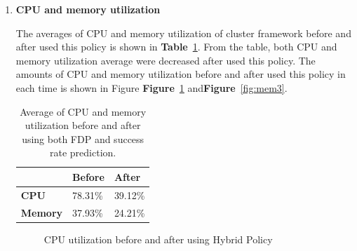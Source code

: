 \documentclass[12pt,oneside,openright,a4paper]{cpe-english-project}
\begin{document}
\begin{enumerate}
\newpage
  \item \textbf{CPU and memory utilization}
  
\hspace{10mm}The averages of CPU and memory utilization of cluster framework before and after used this policy is shown in \textbf{Table}~\ref{tbl:po3CPUMem}. From the table, both CPU and memory utilization average were decreased after used this policy. The amounts of CPU and memory utilization before and after used this policy in each time is shown in Figure \textbf{Figure}~\ref{fig:cpu3} and\textbf{Figure}~\ref{fig:mem3}.    

  \begin{table}[!h]
  \caption{Average of CPU and memory utilization before and after using both FDP and success rate prediction.}\label{tbl:po3CPUMem}
  \begin{tabular}{@{}|p{}|p{}|p{}|}
   \hline
   \textbf{} & \textbf{Before} & \textbf{After} \\ 
   \hline
   \textbf{CPU} & 78.31\% & 39.12\% \\ 
   \hline
   \textbf{Memory} & 37.93\% & 24.21\% \\ 
   \hline                     
  \end{tabular}
\end{table}

\begin{figure}[!h]\centering
    \setlength{\fboxrule}{0mm} %
    \setlength{\fboxsep}{0cm}
    \caption{CPU utilization before and after using Hybrid Policy}\label{fig:cpu3}
\end{figure}


\end{enumerate}
\end{document}
